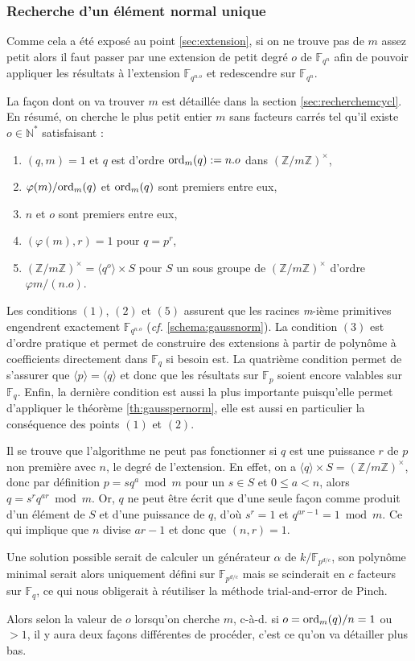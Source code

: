\documentclass[a4paper]{article} %
\numberwithin{section}{part}
\numberwithin{equation}{section}
\newcommand\nroot[1]{\textit{#1}-ième}
\newcommand\zmodninv[1]{(\mathbb{Z}/#1\mathbb{Z})^{\times}}
\newcommand\GF[1]{\mathbb{F}_{#1}}
\newcommand\NN{\mathbb{N}}
\newcommand\groupgen[1]{\langle{#1}\rangle}
\newcommand\ord[2]{\textup{ord}_{#1}(#2)}
\begin{document}
\subsubsection*{Recherche d'un élément normal unique}
Comme cela a été exposé au point \ref{sec:extension}, si on ne trouve pas de $m$
assez petit alors il faut passer par une extension de petit degré $o$ de
$\GF{q^n}$ afin de pouvoir appliquer les résultats à l'extension $\GF{q^{n.o}}$
et redescendre sur $\GF{q^n}$.\par
La façon dont on va trouver $m$ est détaillée dans la section
\ref{sec:recherchemcycl}. En résumé, on cherche le plus petit entier
$m$ sans facteurs carrés tel qu'il existe $o\in\NN^*$ satisfaisant :
\vspace{0.3cm}
\begin{enumerate}[(1)]
    \item $(q, m) = 1$ et $q$ est d'ordre $\ord{m}{q} :=n.o$ dans 
    $\zmodninv{m}$,
    \item $\varphi(m)/\ord{m}{q}$ et $\ord{m}{q}$ sont premiers entre eux,
    \item $n$ et $o$ sont premiers entre eux,
    \item $(\varphi(m), r) = 1$ pour $q = p^r$,
    \item $\zmodninv{m} = \groupgen{q^o}\times S$ pour $S$ un sous groupe
    de $\zmodninv{m}$ d'ordre $\varphi{m}/(n.o)$.
\end{enumerate}
\vspace{0.3cm}
Les conditions $(1)$, $(2)$ et $(5)$ assurent que les racines 
\nroot{m} primitives engendrent exactement $\GF{q^{n.o}}$ (\emph{cf.} 
\ref{schema:gaussnorm}). La condition $(3)$ est d'ordre pratique et permet de
construire des extensions à partir de polynôme à coefficients directement dans 
$\GF{q}$ si besoin est. La quatrième condition permet de s'assurer que
$\groupgen{p} = \groupgen{q}$ et donc que les résultats sur
$\GF{p}$ soient encore valables sur $\GF{q}$. Enfin, la dernière condition est
aussi la plus importante puisqu'elle permet d'appliquer le théorème 
\ref{th:gausspernorm}, elle est aussi en particulier la conséquence des points
$(1)$ et $(2)$.
\begin{rem}
Il se trouve que l'algorithme ne peut pas fonctionner si $q$ est une puissance 
$r$ de $p$ non première avec $n$, le degré de l'extension. En effet, on a 
$\groupgen{q}\times S = \zmodninv{m}$, donc par définition $p = sq^a\bmod 
m$ pour un $s\in S$ et $0 \leq a < n$, alors $q=s^rq^{ar} \bmod m$. 
Or, $q$ ne peut être écrit que d'une seule façon comme produit d'un élément de 
$S$ et d'une puissance de $q$, d'où $s^r = 1$ et $q^{ar - 1} = 1 \bmod m$. 
Ce qui implique que $n$ divise $ar - 1$ et donc que $(n, r) = 1$.\par
Une solution possible serait de calculer un générateur $\alpha$ de 
$k/\GF{p^{d/c}}$, son polynôme minimal serait alors uniquement défini sur 
$\GF{p^{d/c}}$ mais se scinderait en $c$ facteurs sur $\GF{q}$, ce qui nous 
obligerait à réutiliser la méthode trial-and-error de Pinch.
\end{rem}
\vspace{0.3cm}
Alors selon la valeur de $o$ lorsqu'on cherche $m$, c-à-d. si $o = 
\ord{m}{q} /n = 1$ ou $> 1$, il y aura deux façons différentes de procéder, 
c'est ce qu'on va détailler plus bas.
\end{document}
